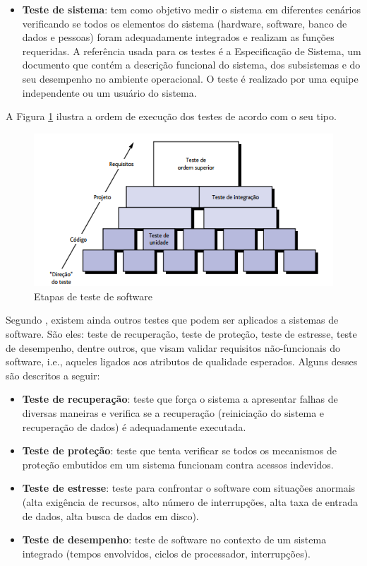 \begin{itemize}
\item {\textbf{Teste de sistema}}: tem como objetivo medir o sistema em diferentes cenários verificando se todos os elementos do sistema (hardware, software, banco de dados e pessoas) foram adequadamente integrados e realizam as funções requeridas. A referência usada para os testes é a Especificação de Sistema, um documento que contém a descrição funcional do sistema, dos subsistemas e do seu desempenho no ambiente operacional. O teste é realizado por uma equipe independente ou um usuário do sistema.

\end{itemize}

A Figura \ref{figure:etapasteste} ilustra a ordem de execução dos testes de acordo com o seu tipo.

\begin{figure}[!htb]
\centering
\includegraphics[width=.75\textwidth]{images/etapasteste.png}
\caption{Etapas de teste de software \cite{PRESSMAN2016}}
\label{figure:etapasteste}
\end{figure}

Segundo , existem ainda outros testes que podem ser aplicados a sistemas de software. São eles: teste de recuperação, teste de proteção, teste de estresse, teste de desempenho, dentre outros, que visam validar requisitos não-funcionais do software, i.e., aqueles ligados aos atributos de qualidade esperados. Alguns desses são descritos a seguir:

\begin{itemize}
    
    \item \textbf{Teste de recuperação}: teste que força o sistema a apresentar falhas de diversas maneiras e verifica se a recuperação (reiniciação do sistema e recuperação de dados) é adequadamente executada.
    
    \item \textbf{Teste de proteção}: teste que tenta verificar se todos os mecanismos de proteção embutidos em um sistema funcionam contra acessos indevidos.
    
    \item \textbf{Teste de estresse}: teste para confrontar o software com situações anormais (alta exigência de recursos, alto número de interrupções, alta taxa de entrada de dados, alta busca de dados em disco).
    
    \item \textbf{Teste de desempenho}: teste de software no contexto de um sistema integrado (tempos envolvidos, ciclos de processador, interrupções).

\end{itemize}

